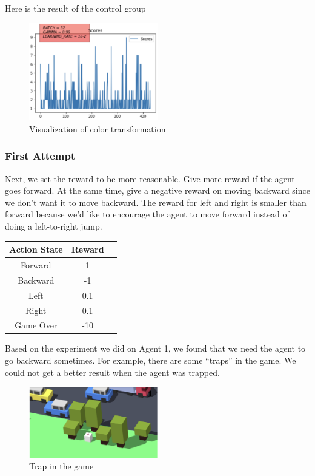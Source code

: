 \documentclass{article}
\begin{document}
Here is the result of the control group
\begin{figure}[h]
\caption{Visualization of color transformation}
\centering
\includegraphics[width=0.5\textwidth]{ControlAgent.png}
\end{figure}

\subsubsection{First Attempt}
Next, we set the reward to be more reasonable. Give more reward if the agent goes forward. At the same time, give a negative reward on moving backward since we don’t want it to move backward. The reward for left and right is smaller than forward because we’d like to encourage the agent to move forward instead of doing a left-to-right jump.

\begin{center}
\begin{tabular}{ | c | c| c | } 
\hline
Action State & Reward\\ 
\hline
Forward & 1\\ 
\hline
Backward & -1\\ 
\hline
Left & 0.1\\ 
\hline
Right & 0.1\\ 
\hline
Game Over & -10\\ 
\hline
\end{tabular}
\end{center}

Based on the experiment we did on Agent 1, we found that we need the agent to go backward sometimes. For example, there are some “traps” in the game. We could not get a better result when the agent was trapped.

\begin{figure}[h]
\caption{Trap in the game}
\centering
\includegraphics[width=0.5\textwidth]{trap.png}
\end{figure}
\end{document}
